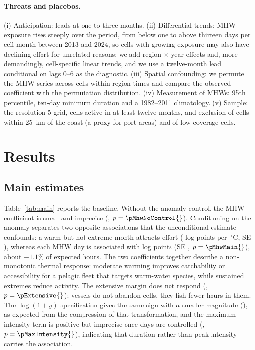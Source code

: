 \documentclass[12pt,a4paper]{article}
\begin{document}
\paragraph{Threats and placebos.} (i) Anticipation: leads at one to three months. (ii) Differential trends: MHW exposure rises steeply over the period, from below one to above thirteen days per cell-month between 2013 and 2024, so cells with growing exposure may also have declining effort for unrelated reasons; we add region $\times$ year effects and, more demandingly, cell-specific linear trends, and we use a twelve-month lead conditional on lags 0--6 as the diagnostic. (iii) Spatial confounding: we permute the MHW series across cells within region \nPermutations{} times and compare the observed coefficient with the permutation distribution. (iv) Measurement of MHWs: 95th percentile, ten-day minimum duration and a 1982--2011 climatology. (v) Sample: the resolution-5 grid, cells active in at least twelve months, and exclusion of cells within 25~km of the coast (a proxy for port areas) and of low-coverage cells.

\section{Results}\label{sec:results}
\subsection{Main estimates}
Table~\ref{tab:main} reports the baseline. Without the anomaly control, the MHW coefficient is small and imprecise (\bMhwNoControl{}, $p=\pMhwNoControl{}$). Conditioning on the anomaly separates two opposite associations that the unconditional estimate confounds: a warm-but-not-extreme month attracts effort (\bSstAnom{} log points per~$^{\circ}$C, SE \seSstAnom{}), whereas each MHW day is associated with \bMhwMain{} log points (SE \seMhwMain{}, $p=\pMhwMain{}$), about $-1.1\%$ of expected hours. The two coefficients together describe a non-monotonic thermal response: moderate warming improves catchability or accessibility for a pelagic fleet that targets warm-water species, while sustained extremes reduce activity. The extensive margin does not respond (\bExtensive{}, $p=\pExtensive{}$): vessels do not abandon cells, they fish fewer hours in them. The $\log(1+y)$ specification gives the same sign with a smaller magnitude (\bLogOnePlus{}), as expected from the compression of that transformation, and the maximum-intensity term is positive but imprecise once days are controlled (\bMaxIntensity{}, $p=\pMaxIntensity{}$), indicating that duration rather than peak intensity carries the association.
\end{document}
